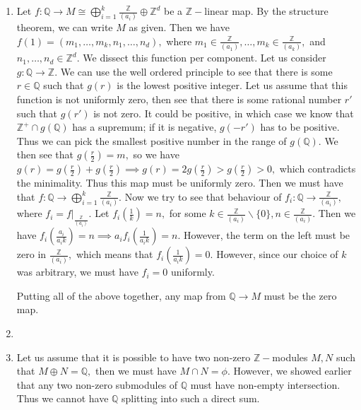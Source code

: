\documentclass{article}
\begin{document}
\begin{enumerate}
	\item Let $f: \mathbb{Q} \rightarrow M \cong \bigoplus_{i=1}^k \frac{\mathbb{Z}}{(a_i)} \oplus \mathbb{Z}^d$ be a $\mathbb{Z}-$linear map. By the 
	structure theorem, we can write $M$ as given. Then we have $f(1)=(m_1,\dots,m_k,n_1,\dots,n_d),$ where $m_1 \in \frac{\mathbb{Z}}{(a_1)}, \dots, m_k \in 
	\frac{\mathbb{Z}}{(a_k)},$ and $n_1,\dots,n_d \in \mathbb{Z}^d.$ We dissect this function per component. Let us consider $g: \mathbb{Q} \rightarrow 
	\mathbb{Z}.$ We can use the well ordered principle to see that there is some $r \in \mathbb{Q}$ such that $g(r)$ is the lowest positive integer. Let us 
	assume that this function is not uniformly zero, then see that there is some rational number $r'$ such that $g(r')$ is not zero. It could be positive, 
	in which case we know that $\mathbb{Z}^+ \cap g(\mathbb{Q})$ has a supremum; if it is negative, $g(-r')$ has to be positive. Thus we can pick the 
	smallest positive number in the range of $g(\mathbb{Q}).$ We then see that $g\left(\frac{r}{2}\right)=m,$ so we have 
	$g(r)=g\left(\frac{r}{2}\right)+g\left(\frac{r}{2}\right) \implies g(r)=2g\left(\frac{r}{2}\right) > g\left(\frac{r}{2}\right) > 0,$ which contradicts 
	the minimality. Thus this map must be uniformly zero. Then we must have that $f:\mathbb{Q} \rightarrow \bigoplus_{i=1}^k \frac{\mathbb{Z}}{(a_i)}.$ Now 
	we try to see that behaviour of $f_i: \mathbb{Q} \rightarrow \frac{\mathbb{Z}}{(a_i)},$ where $f_i=f|_{\frac{\mathbb{Z}}{(a_i)}}$. Let 
	$f_i\left(\frac{1}{k}\right)=n,$ for some $k \in \frac{\mathbb{Z}}{(a_i)}\backslash \{0\}, n \in \frac{\mathbb{Z}}{(a_i)}.$ Then we have 
	$f_i\left(\frac{a_i}{a_ik}\right)=n \implies a_if_i\left(\frac{1}{a_ik}\right)=n.$ However, the term on the left must be zero in 
	$\frac{\mathbb{Z}}{(a_i)},$ which means that $ f_i\left(\frac{1}{a_ik}\right)=0.$ However, since our choice of $k$ was arbitrary, we must have $f_i=0$ 
	uniformly. 
		
	Putting all of the above together, any map from $\mathbb{Q} \rightarrow M$ must be the zero map. 
	
	\item
	 
	\item Let us assume that it is possible to have two non-zero $\mathbb{Z}-$modules $M, N$ such that $M \oplus N =\mathbb{Q},$ then we must have $M \cap N 
	=\phi.$ However, we showed earlier that any two non-zero submodules of $\mathbb{Q}$ must have non-empty intersection. Thus we cannot have $\mathbb{Q}$ 
	splitting into such a direct sum.
	

\end{enumerate}
\end{document}
